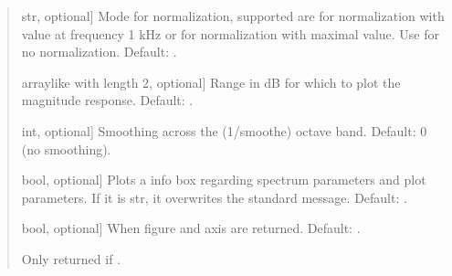 \documentclass[letterpaper,10pt,english]{sphinxmanual}
\begin{document}
\begin{fulllineitems}
\begin{fulllineitems}
\begin{quote}
\begin{description}
\begin{description}
\sphinxlineitem{\sphinxstylestrong{normalize}}{[}str, optional{]}
\sphinxAtStartPar
Mode for normalization, supported are  for normalization
with value at frequency 1 kHz or  for normalization with
maximal value. Use  for no normalization. Default: .

\sphinxlineitem{\sphinxstylestrong{range\_db}}{[}array\sphinxhyphen{}like with length 2, optional{]}
\sphinxAtStartPar
Range in dB for which to plot the magnitude response.
Default: .

\sphinxlineitem{\sphinxstylestrong{smoothe}}{[}int, optional{]}
\sphinxAtStartPar
Smoothing across the (1/smoothe) octave band.
Default: 0 (no smoothing).

\sphinxlineitem{\sphinxstylestrong{show\_info\_box}}{[}bool, optional{]}
\sphinxAtStartPar
Plots a info box regarding spectrum parameters and plot parameters.
If it is str, it overwrites the standard message.
Default: .

\sphinxlineitem{\sphinxstylestrong{returns}}{[}bool, optional{]}
\sphinxAtStartPar
When  figure and axis are returned. Default: .

\end{description}

\begin{description}
\sphinxAtStartPar
Only returned if .

\end{description}

\end{description}\end{quote}

\end{fulllineitems}



\end{fulllineitems}
\end{document}
